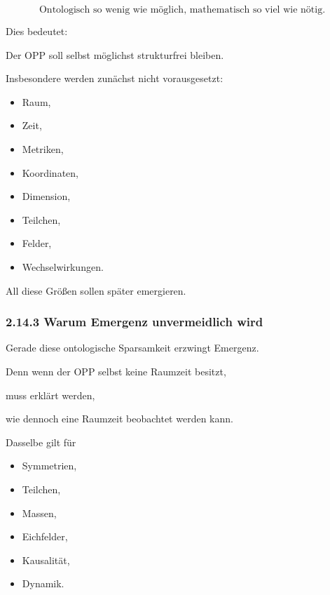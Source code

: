 \[
\boxed{
\text{Ontologisch so wenig wie möglich,
mathematisch so viel wie nötig.}
}
\]

Dies bedeutet:

Der OPP soll selbst möglichst strukturfrei bleiben.

Insbesondere werden zunächst nicht vorausgesetzt:

\begin{itemize}

\item Raum,

\item Zeit,

\item Metriken,

\item Koordinaten,

\item Dimension,

\item Teilchen,

\item Felder,

\item Wechselwirkungen.

\end{itemize}

All diese Größen sollen später emergieren.


\subsubsection*{2.14.3 Warum Emergenz unvermeidlich wird}

Gerade diese ontologische Sparsamkeit erzwingt Emergenz.

Denn wenn der OPP selbst keine Raumzeit besitzt,

muss erklärt werden,

wie dennoch eine Raumzeit beobachtet werden kann.

Dasselbe gilt für

\begin{itemize}

\item Symmetrien,

\item Teilchen,

\item Massen,

\item Eichfelder,

\item Kausalität,

\item Dynamik.

\end{itemize}


